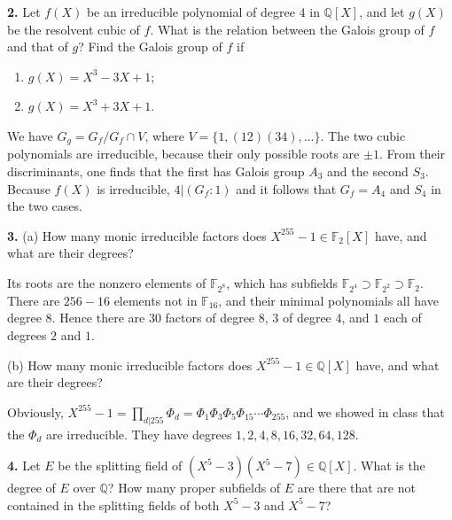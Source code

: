\documentclass[a4paper,11pt,final,openany]{memoir}
\theoremstyle{nonumberplain}
\begin{document}
\medskip\noindent\textbf{2.} Let $f(X)$ be an irreducible polynomial of degree
$4$ in ${\mathbb{Q}}[X]$, and let $g(X)$ be the resolvent cubic of $f$. What
is the relation between the Galois group of $f$ and that of $g$? Find the
Galois group of $f$ if

\begin{enumerate}
\item $g(X)=X^{3}-3X+1$;

\item $g(X)=X^{3}+3X+1$.
\end{enumerate}

We have $G_{g}=G_{f}/G_{f}\cap V$, where $V=\{1,(12)(34),\ldots\}$. The two
cubic polynomials are irreducible, because their only possible roots are
$\pm1$. From their discriminants, one finds that the first has Galois group
$A_{3}$ and the second $S_{3}$. Because $f(X)$ is irreducible, $4|(G_{f}%
\colon1)$ and it follows that $G_{f}=A_{4}$ and $S_{4}$ in the two cases.

\medskip\noindent\textbf{3.} (a) How many monic irreducible factors does
$X^{255}-1\in\mathbb{F}_{2}[X]$ have, and what are their degrees?

Its roots are the nonzero elements of $\mathbb{F}_{2^{8}}$, which has
subfields $\mathbb{F}_{2^{4}}\mathbb{\supset F}_{2^{2}}\mathbb{\supset F}_{2}
$. There are $256-16$ elements not in $\mathbb{F}_{16}$, and their minimal
polynomials all have degree $8$. Hence there are $30$ factors of degree $8$,
$3$ of degree $4$, and $1$ each of degrees $2$ and $1$.

\noindent(b) How many monic irreducible factors does $X^{255}-1\in{\mathbb{Q}%
}[X]$ have, and what are their degrees?

Obviously, $X^{255}-1=\prod_{d|255}\Phi_{d}=\Phi_{1}\Phi_{3}\Phi_{5}\Phi
_{15}\cdots\Phi_{255}$, and we showed in class that the $\Phi_{d}$ are
irreducible. They have degrees $1,2,4,8,16,32,64,128$.

\medskip\noindent\textbf{4.} Let $E$ be the splitting field of $(X^{5}%
-3)(X^{5}- 7)\in{\mathbb{Q}}[X]$. What is the degree of $E$ over ${\mathbb{Q}%
}$? How many proper subfields of $E$ are there that are not contained in the
splitting fields of both $X^{5}-3$ and $X^{5}-7$?
\end{document}
